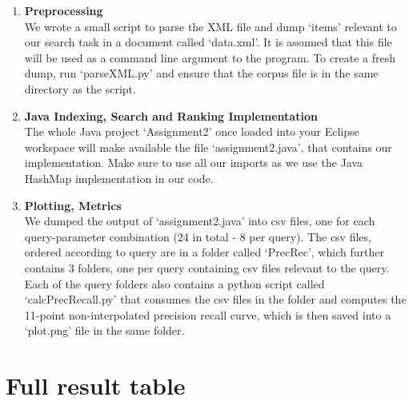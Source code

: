 \begin{enumerate}

\item {\bf Preprocessing} \\
We wrote a small script to parse the XML file and dump \lq items' relevant to our search task
in a document called \lq data.xml'. It is assumed that this file will be used as a command line
argument to the program. To create a fresh dump, run \lq parseXML.py' and ensure that the corpus
file is in the same directory as the script. 
\item {\bf Java Indexing, Search and Ranking Implementation} \\
The whole Java project \lq Assignment2' once loaded into your Eclipse workspace
will make available the file \lq assignment2.java', that contains our implementation. 
Make sure to use all our imports as we use the Java HashMap implementation in our code.
\item {\bf Plotting, Metrics} \\
We dumped the output of \lq assignment2.java' into csv files, one for each query-parameter
combination (24 in total - 8 per query). The csv files, ordered according to query are in
a folder called \lq PrecRec', which further contains 3 folders, one per query containing csv
files relevant to the query. Each of the query folders also contains a python script called \lq calcPrecRecall.py\rq 
that consumes the csv files in the folder and computes the 11-point non-interpolated precision recall curve,
which is then saved into a \lq plot.png' file in the same folder. 
\end{enumerate}

\newpage
\section{Full result table} \label{App:table}

